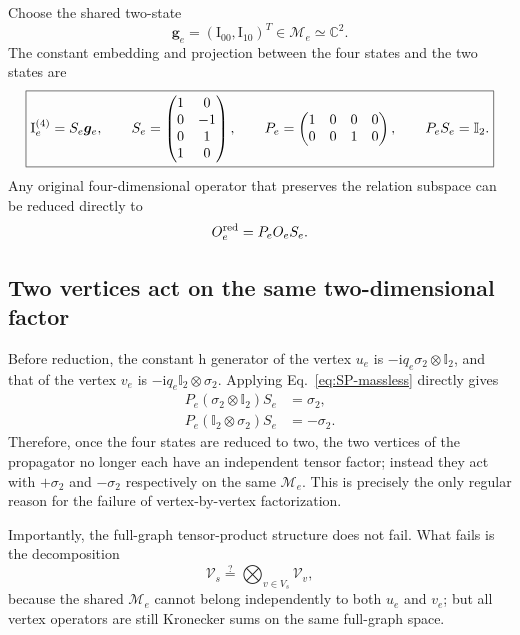 \documentclass[11pt,a4paper]{article}
\newcommand{\ii}{\mathrm i}
\newcommand{\Id}{\mathbb I}
\newcommand{\cV}{\mathcal V}
\newcommand{\cM}{\mathcal M}
\begin{document}
Choose the shared two-state
\begin{equation}
 \bm g_e=(\text{I}_{00},\text{I}_{10})^T\in\cM_e\simeq\mathbb C^2.
\end{equation}
The constant embedding and projection between the four states and the two states are
\begin{equation}
 \boxed{
 \bm{\text I}_e^{(4)}=S_e\bm g_e,
 \qquad
 S_e=
 \begin{pmatrix}
 1&0\\
 0&-1\\
 0&1\\
 1&0
 \end{pmatrix},
 \qquad
 P_e=
 \begin{pmatrix}
 1&0&0&0\\
 0&0&1&0
 \end{pmatrix},
 \qquad P_eS_e=\Id_2.
 }
 \label{eq:SP-massless}
\end{equation}
Any original four-dimensional operator that preserves the relation subspace can be reduced directly to
\begin{equation}
 O_e^{\rm red}=P_eO_eS_e.
 \label{eq:POS-reduction}
\end{equation}

\subsection{Two vertices act on the same two-dimensional factor}

Before reduction, the constant h generator of the vertex $u_e$ is $-\ii q_e\sigma_2\otimes \Id_2$, and that of the vertex $v_e$ is $-\ii q_e\Id_2\otimes\sigma_2$. Applying Eq.~\eqref{eq:SP-massless} directly gives
\begin{align}
 P_e(\sigma_2\otimes \Id_2)S_e&=\sigma_2,
 \label{eq:first-endpoint-projection}\\
 P_e(\Id_2\otimes\sigma_2)S_e&=-\sigma_2.
 \label{eq:second-endpoint-projection}
\end{align}
Therefore, once the four states are reduced to two, the two vertices of the propagator no longer each have an independent tensor factor; instead they act with $+\sigma_2$ and $-\sigma_2$ respectively on the same $\cM_e$. This is precisely the only regular reason for the failure of vertex-by-vertex factorization.

Importantly, the full-graph tensor-product structure does not fail. What fails is the decomposition
\begin{equation}
 \cV_s\stackrel{?}{=}\bigotimes_{v\in V_s}\cV_v,
\end{equation}
because the shared $\cM_e$ cannot belong independently to both $u_e$ and $v_e$; but all vertex operators are still Kronecker sums on the same full-graph space.
\end{document}
